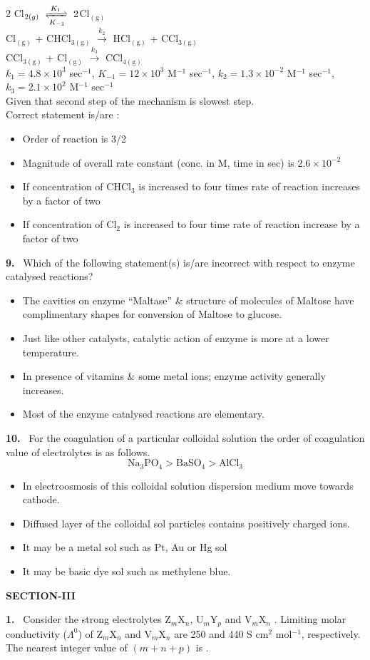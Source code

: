 \documentclass[10pt]{extarticle}
\newcommand{\sect}[1]{\par\smallskip\noindent\textbf{#1}\par}
\newcommand{\qn}[1]{\par\smallskip\noindent\textbf{#1.}~}
\newenvironment{qoptions}{\begin{itemize}[leftmargin=1.8em,itemsep=1pt,topsep=2pt,label={}]}{\end{itemize}}
\newcommand{\opt}[2]{\item[(#1)] #2}
\begin{document}
\begin{multicols}{2}
Cl$_{2(g)}\ \xrightleftharpoons[K_{-1}]{K_1}\ 2$Cl$_{\mathrm{(g)}}$\\
Cl$_{\mathrm{(g)}}$ + CHCl$_{3\mathrm{(g)}}$ $\xrightarrow{k_2}$ HCl$_{\mathrm{(g)}}$ + CCl$_{3\mathrm{(g)}}$\\
CCl$_{3\mathrm{(g)}}$ + Cl$_{\mathrm{(g)}}$ $\xrightarrow{k_3}$ CCl$_{4\mathrm{(g)}}$\\
$k_1=4.8\times10^3$ sec$^{-1}$, $K_{-1}=12\times10^3$ M$^{-1}$ sec$^{-1}$, $k_2=1.3\times10^{-2}$ M$^{-1}$ sec$^{-1}$, $k_3=2.1\times10^2$ M$^{-1}$ sec$^{-1}$\\
Given that second step of the mechanism is slowest step.\\
Correct statement is/are :
\begin{qoptions}
\opt{A}{Order of reaction is 3/2}
\opt{B}{Magnitude of overall rate constant (conc. in M, time in sec) is $2.6\times10^{-2}$}
\opt{C}{If concentration of CHCl$_3$ is increased to four times rate of reaction increases by a factor of two}
\opt{D}{If concentration of Cl$_2$ is increased to four time rate of reaction increase by a factor of two}
\end{qoptions}
\qn{9} Which of the following statement(s) is/are incorrect with respect to enzyme catalysed reactions?
\begin{qoptions}
\opt{A}{The cavities on enzyme ``Maltase'' \& structure of molecules of Maltose have complimentary shapes for conversion of Maltose to glucose.}
\opt{B}{Just like other catalysts, catalytic action of enzyme is more at a lower temperature.}
\opt{C}{In presence of vitamins \& some metal ions; enzyme activity generally increases.}
\opt{D}{Most of the enzyme catalysed reactions are elementary.}
\end{qoptions}
\qn{10} For the coagulation of a particular colloidal solution the order of coagulation value of electrolytes is as follows.
\[\mathrm{Na_3PO_4>BaSO_4>AlCl_3}\]
\begin{qoptions}
\opt{A}{In electroosmosis of this colloidal solution dispersion medium move towards cathode.}
\opt{B}{Diffused layer of the colloidal sol particles contains positively charged ions.}
\opt{C}{It may be a metal sol such as Pt, Au or Hg sol}
\opt{D}{It may be basic dye sol such as methylene blue.}
\end{qoptions}
\sect{SECTION-III}
\qn{1} Consider the strong electrolytes Z$_m$X$_n$, U$_m$Y$_p$ and V$_m$X$_n$ . Limiting molar conductivity ($\Lambda^0$) of Z$_m$X$_n$ and V$_m$X$_n$ are 250 and 440 S cm$^2$ mol$^{-1}$, respectively. The nearest integer value of $(m+n+p)$ is \underline{\hspace{1.2cm}}.\\

\end{multicols}
\end{document}

